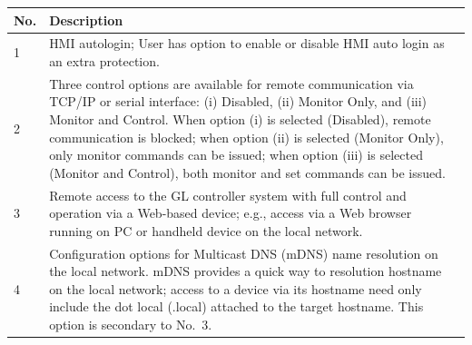 \begin{longtable}[]{@{}ll@{}}
\toprule
\begin{minipage}[b]{0.07\columnwidth}\raggedright
No.\strut
\end{minipage} & \begin{minipage}[b]{0.88\columnwidth}\raggedright
Description\strut
\end{minipage}\tabularnewline
\midrule
\endhead
\begin{minipage}[t]{0.07\columnwidth}\raggedright
1\strut
\end{minipage} & \begin{minipage}[t]{0.88\columnwidth}\raggedright
HMI autologin; User has option to enable or disable HMI auto login as an
extra protection.\strut
\end{minipage}\tabularnewline
\begin{minipage}[t]{0.07\columnwidth}\raggedright
2\strut
\end{minipage} & \begin{minipage}[t]{0.88\columnwidth}\raggedright
Three control options are available for remote communication via TCP/IP
or serial interface: (i) Disabled, (ii) Monitor Only, and (iii) Monitor
and Control. When option (i) is selected (Disabled), remote
communication is blocked; when option (ii) is selected (Monitor Only),
only monitor commands can be issued; when option (iii) is selected
(Monitor and Control), both monitor and set commands can be
issued.\strut
\end{minipage}\tabularnewline
\begin{minipage}[t]{0.07\columnwidth}\raggedright
3\strut
\end{minipage} & \begin{minipage}[t]{0.88\columnwidth}\raggedright
Remote access to the GL controller system with full control and
operation via a Web-based device; e.g., access via a Web browser running
on PC or handheld device on the local network.\strut
\end{minipage}\tabularnewline
\begin{minipage}[t]{0.07\columnwidth}\raggedright
4\strut
\end{minipage} & \begin{minipage}[t]{0.88\columnwidth}\raggedright
Configuration options for Multicast DNS (mDNS) name resolution on the
local network. mDNS provides a quick way to resolution hostname on the
local network; access to a device via its hostname need only include the
dot local (.local) attached to the target hostname. This option is
secondary to No.~3.\strut
\end{minipage}\tabularnewline
\bottomrule
\end{longtable}

